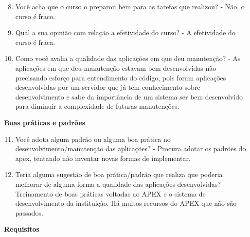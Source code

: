 \begin{anexosenv}
\begin{enumerate}
\setcounter{enumi}{7}
\item Você acha que o curso o preparou bem para as tarefas que realizou?\newline
- Não, o curso é fraco.
\item Qual a sua opinião com relação a efetividade do curso?\newline
- A efetividade do curso é fraca.
\item Como você avalia a qualidade das aplicações em que deu manutenção?\newline
- As aplicações em que deu manutenção estavam bem desenvolvidas não precisando esforço para entendimento do código, pois foram aplicações desenvolvidas por um servidor que já tem conhecimento sobre desenvolvimento e sabe da importância de um sistema ser bem desenvolvido para diminuir a complexidade de futuras manutenções.
\end{enumerate}

\textbf{Boas práticas e padrões}

\begin{enumerate}
\setcounter{enumi}{10}
\item Você adota algum padrão ou alguma boa prática no desenvolvimento/manutenção das
aplicações?\newline
- Procura adotar os padrões do apex, tentando não inventar novas formas de implementar.
\item Teria alguma sugestão de boa prática/padrão que realiza que poderia melhorar de
alguma forma a qualidade das aplicações desenvolvidas?\newline
- Treinamento de boas práticas voltadas ao APEX e o sistema de desenvolvimento da instituição. Há muitos recursos do APEX que não são passados.
\end{enumerate}

\textbf{Requisitos}


\end{anexosenv}
